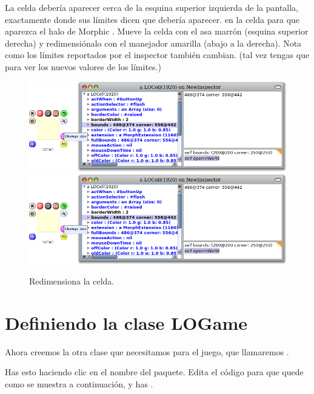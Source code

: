 \documentclass[a4paper,10pt,twoside]{book}
\begin{document}
La celda deber\'ia aparecer cerca de la esquina superior izquierda de la pantalla, exactamente donde sus l\'imites dicen que deber\'ia aparecer. 
\metaclick en la celda para que aparezca el halo de Morphic . %
Mueve la celda con el asa marr\'on (esquina superior derecha) y redimensi\'onalo con el manejador amarilla (abajo a la derecha).
Nota como los l\'imites reportados por el inspector tambi\'en cambian. 
(tal vez tengas que \actclick{}  para ver los nuevos valores de los l\'imites.)

\begin{figure}[htbp]
\centering
\ifluluelse
	{\includegraphics[width=\textwidth]{LOCellResize} }
	{\includegraphics[scale=0.7]{LOCellResize} }
\caption{Redimensiona la celda.}
\end{figure}


\section{Definiendo la clase LOGame}

Ahora creemos la otra clase que necesitamos para el juego, que llamaremos .

Has esto haciendo clic en el nombre del paquete.
Edita el c\'odigo para que quede como se muestra a continuaci\'on, y has .
\end{document}
